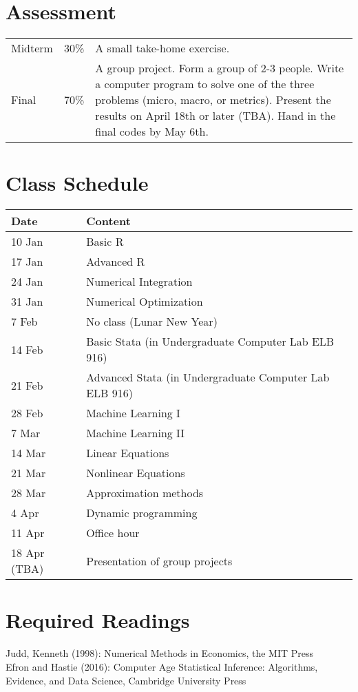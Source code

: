 \documentclass[11pt]{article}
\begin{document}
\section{Assessment}
\begin{tabular}{p{0.5in}p{0.5in}p{5in}}
   Midterm & 30\% & A small take-home exercise. \\
   Final  & 70\%  & A group project. Form a group of 2-3 people. Write a computer program to solve one of the three problems (micro, macro, or metrics). Present the results on April 18th or later (TBA). Hand in the final codes by May 6th.
\end{tabular}

\section{Class Schedule}
\begin{tabular}{p{1in}p{4in}}
  \hline
  Date & Content \\
  \hline
  10 Jan & Basic R \\
  17 Jan & Advanced R \\
  24 Jan & Numerical Integration  \\
  31 Jan & Numerical Optimization  \\
  7 Feb & No class (Lunar New Year)\\
  14 Feb & Basic Stata (in Undergraduate Computer Lab ELB 916) \\
  21 Feb & Advanced Stata (in Undergraduate Computer Lab ELB 916)\\
  28 Feb & Machine Learning I  \\
  7 Mar &  Machine Learning II \\
  14 Mar & Linear Equations \\
  21 Mar & Nonlinear Equations \\
  28 Mar & Approximation methods \\
  4 Apr & Dynamic programming \\
  11 Apr & Office hour \\
  18 Apr (TBA) & Presentation of group projects \\   
  \hline
\end{tabular}


\section{Required Readings}
Judd, Kenneth (1998): Numerical Methods in Economics, the MIT Press \\
Efron and Hastie (2016): Computer Age Statistical Inference: Algorithms, Evidence, and Data Science, Cambridge University Press
\end{document}
